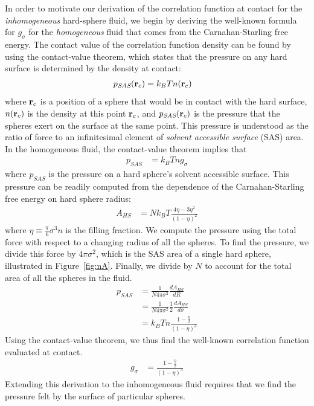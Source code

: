In order to motivate our derivation of the correlation function at
contact for the \emph{inhomogeneous} hard-sphere fluid, we begin by
deriving the well-known formula for $g_\sigma$ for the
\emph{homogeneous} fluid that comes from the Carnahan-Starling free
energy.  The contact value of the correlation function density can be
found by using the contact-value theorem, which states that the
pressure on any hard surface is determined by the density at contact:
\begin{align}
  p_{\textit{SAS}}(\textbf{r}_c) &= k_BT n(\textbf{r}_c)
\end{align}
where $\textbf{r}_c$ is a position of a sphere that would be in contact with
the hard surface, $n(\textbf{r}_c)$ is the density at this point $\textbf{r}_c$, and
$p_{\textit{SAS}}(\textbf{r}_c)$ is the pressure that the spheres
exert on the surface at the same point.  This pressure is
understood as the ratio of force to an infinitesimal element of
\emph{solvent accessible surface} (SAS) area.
%
In the homogeneous fluid, the contact-value theorem implies that
\begin{align}
  p_{\textit{SAS}} &= k_BT n g_\sigma
\end{align}
where $p_{SAS}$ is the pressure on a hard sphere's solvent accessible surface.
This pressure can be
readily computed from the dependence of the Carnahan-Starling free
energy on hard sphere radius:
\begin{align}
  A_{HS} &= Nk_BT \frac{4\eta - 3\eta^2}{(1-\eta)^2}
\end{align}
where $\eta \equiv \frac{\pi}{6} \sigma^3 n$ is the filling fraction.
We compute the pressure using the total force with
respect to a changing radius of all the spheres.
To find the pressure, we divide this force by $4\pi \sigma^2$, which
is the SAS area of a single hard sphere, illustrated in Figure~\ref{fig:nA}.
Finally, we divide by $N$ to account for the total area of all the
spheres in the fluid.
\begin{align}
  p_{\textit{SAS}} &= \frac{1}{N 4\pi \sigma^2} \frac{dA_{HS}}{dR} \\
  &= \frac{1}{N 4\pi \sigma^2} \frac12 \frac{dA_{HS}}{d\sigma} \\
  &= k_BT n \frac{1 - \frac{\eta}2}{(1-\eta)^3}
\end{align}
Using the contact-value theorem, we thus find the well-known
correlation function evaluated at contact.
\begin{align}
  g_\sigma &= \frac{1 - \frac{\eta}2}{(1-\eta)^3} \label{eq:cs-g}
\end{align}
Extending this derivation to the inhomogeneous fluid requires that we
find the pressure felt by the surface of particular spheres.


